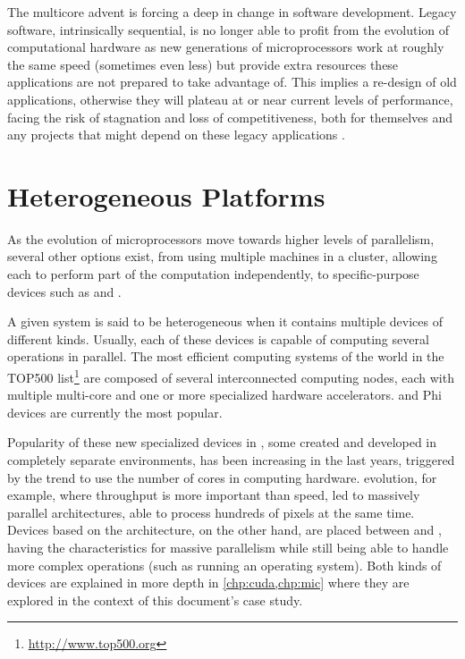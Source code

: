 \documentclass[../thesis]{subfiles}
\begin{document}
	The multicore advent is forcing a deep in change in software development. Legacy software, intrinsically sequential, is no longer able to profit from the evolution of computational hardware as new generations of microprocessors work at roughly the same speed (sometimes even less) but provide extra resources these applications are not prepared to take advantage of. This implies a re-design of old applications, otherwise they will plateau at or near current levels of performance, facing the risk of stagnation and loss of competitiveness, both for themselves and any projects that might depend on these legacy applications \cite{Farber:2011:RedefiningWhatIsPossible}.

		\section{Heterogeneous Platforms}
		As the evolution of microprocessors move towards higher levels of parallelism, several other options exist, from using multiple machines in a cluster, allowing each to perform part of the computation independently, to specific-purpose devices such as \dsps and \gpus.

		A given system is said to be heterogeneous when it contains multiple devices of different kinds. Usually, each of these devices is capable of computing several operations in parallel. The most efficient computing systems of the world in the TOP500 list\footnote{\url{http://www.top500.org}} are composed of several interconnected computing nodes, each with multiple multi-core \cpus and one or more specialized hardware accelerators. \gpus and \intel\xeon Phi devices are currently the most popular.

		Popularity of these new specialized devices in \hpc, some created and developed in completely separate environments, has been increasing in the last years, triggered by the trend to use the number of cores in computing hardware. \gpus evolution, for example, where throughput is more important than speed, led to massively parallel architectures, able to process hundreds of pixels at the same time. Devices based on the \intel\mic architecture, on the other hand, are placed between \gpus and \cpus, having the characteristics for massive parallelism while still being able to handle more complex operations (such as running an operating system). Both kinds of devices are explained in more depth in \cref{chp:cuda,chp:mic} where they are explored in the context of this document's case study.
\end{document}
